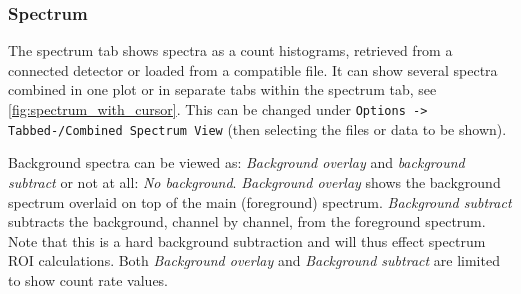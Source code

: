 \subsubsection{Spectrum}\label{sec:spectrum}
The spectrum tab shows spectra as a count histograms, retrieved from a connected detector or loaded from a compatible file. It can show several spectra combined in one plot or in separate tabs within the spectrum tab, see \autoref{fig:spectrum_with_cursor}. This can be changed under \texttt{Options -> Tabbed-/Combined Spectrum View} (then selecting the files or data to be shown).


Background spectra can be viewed as: \textit{Background overlay} and \textit{background subtract} or not at all: \textit{No background}. \textit{Background overlay} shows the background spectrum overlaid on top of the main (foreground) spectrum. \textit{Background subtract} subtracts the background, channel by channel, from the foreground spectrum. Note that this is a hard background subtraction and will thus effect spectrum ROI calculations. Both \textit{Background overlay} and \textit{Background subtract} are limited to show count rate values.

